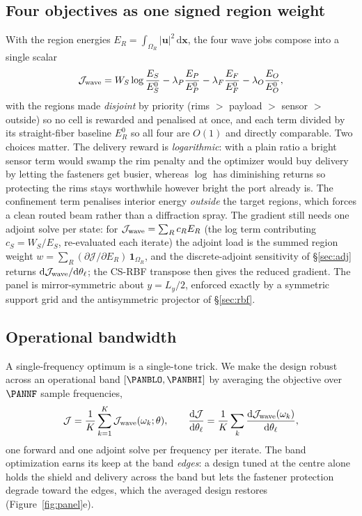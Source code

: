 \documentclass[11pt]{article}
\begin{document}
\subsection{Four objectives as one signed region weight}
With the region energies $E_R=\int_{\Omega_R}|\mathbf u|^2\,\mathrm d\mathbf x$, the four
wave jobs compose into a single scalar
\begin{equation}
  \mathcal J_{\rm wave}=W_S\log\frac{E_S}{E_S^0}
  -\lambda_P\frac{E_P}{E_P^0}-\lambda_F\frac{E_F}{E_F^0}-\lambda_O\frac{E_O}{E_O^0},
  \label{eq:panelobj}
\end{equation}
with the regions made \emph{disjoint} by priority (rims $>$ payload $>$ sensor $>$
outside) so no cell is rewarded and penalised at once, and each term divided by its
straight-fiber baseline $E_R^0$ so all four are $O(1)$ and directly comparable. Two
choices matter. The delivery reward is \emph{logarithmic}: with a plain ratio a bright
sensor term would swamp the rim penalty and the optimizer would buy delivery by letting
the fasteners get busier, whereas $\log$ has diminishing returns so protecting the rims
stays worthwhile however bright the port already is. The confinement term penalises
interior energy \emph{outside} the target regions, which forces a clean routed beam
rather than a diffraction spray. The gradient still needs one adjoint solve per state:
for $\mathcal J_{\rm wave}=\sum_R c_R E_R$ (the log term contributing $c_S=W_S/E_S$,
re-evaluated each iterate) the adjoint load is the summed region weight
$w=\sum_R(\partial\mathcal J/\partial E_R)\,\mathbf 1_{\Omega_R}$, and the
discrete-adjoint sensitivity of \S\ref{sec:adj} returns
$\mathrm d\mathcal J_{\rm wave}/\mathrm d\theta_\ell$; the CS-RBF transpose then gives the
reduced gradient. The panel is mirror-symmetric about $y=L_y/2$, enforced exactly by a
symmetric support grid and the antisymmetric projector of \S\ref{sec:rbf}.

\subsection{Operational bandwidth}
A single-frequency optimum is a single-tone trick. We make the design robust across an
operational band $[\PANBLO,\PANBHI]$ by averaging the objective over $\PANNF$ sample
frequencies,
\begin{equation}
  \mathcal J=\frac1K\sum_{k=1}^{K}\mathcal J_{\rm wave}(\omega_k;\theta),\qquad
  \frac{\mathrm d\mathcal J}{\mathrm d\theta_\ell}
  =\frac1K\sum_k\frac{\mathrm d\mathcal J_{\rm wave}(\omega_k)}{\mathrm d\theta_\ell},
  \label{eq:panelband}
\end{equation}
one forward and one adjoint solve per frequency per iterate. The band optimization earns
its keep at the band \emph{edges}: a design tuned at the centre alone holds the shield and
delivery across the band but lets the fastener protection degrade toward the edges, which
the averaged design restores (Figure~\ref{fig:panel}e).
\end{document}
